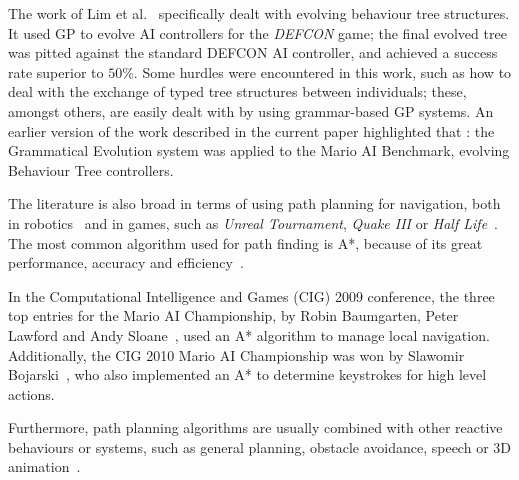 \documentclass[conference]{IEEEtran}
\begin{document}

The work of Lim et al.~\cite{LBC10} specifically
dealt with evolving behaviour tree structures. It used GP
to evolve AI controllers for the \textit{DEFCON} game; the final evolved
tree was pitted against the standard DEFCON AI controller, and achieved a
success rate superior to $50\%$. Some hurdles
were encountered in this work, such as how to deal with the exchange of typed
tree structures between individuals; these, amongst others, are easily dealt
with by using grammar-based GP systems. An earlier version of the work
described in the current paper highlighted that \cite{PNO11}: the Grammatical
Evolution system was applied to the Mario AI Benchmark, evolving Behaviour
Tree controllers.

The literature is also broad in terms of using path planning for navigation, 
both in robotics~\cite{MF03} and in games, such as \textit{Unreal
Tournament}, \textit{Quake III} or \textit{Half Life}~\cite{Bir99}. The most
common algorithm used for path finding is A*, because of its great performance,
accuracy and efficiency~\cite{BT98}. 

In the Computational Intelligence and Games 
(CIG) 2009 conference, the three top entries for the Mario AI Championship, 
by Robin Baumgarten, Peter Lawford and Andy Sloane~\cite{TKB10}, used 
an A* algorithm to manage local navigation. Additionally, the CIG 2010 Mario 
AI Championship was won by Slawomir Bojarski~\cite{BC10}, who also 
implemented an A* to determine keystrokes for high level actions. 

Furthermore, path planning algorithms are usually combined with other reactive 
behaviours or systems, such as general planning, obstacle avoidance, 
speech or 3D animation~\cite{CBP99}. 
\end{document}
